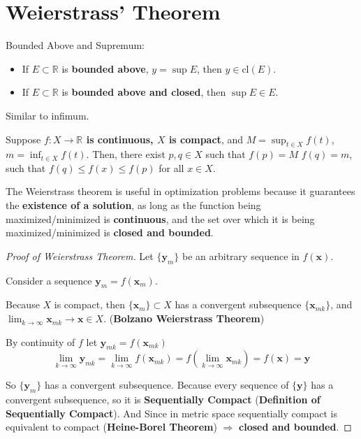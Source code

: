 \section{Weierstrass' Theorem}

\begin{proposition} Bounded Above and Supremum:
    \begin{itemize}
        \item If \(E \subset \mathbb{R}\) is \textbf{bounded above}, \(y = \sup E\), then \(y \in \text{cl} (E)\).
        \item If \(E \subset \mathbb{R}\) is \textbf{bounded above and closed}, then \(\sup E \in E\).
    \end{itemize}
\end{proposition}

\begin{remark*}
    Similar to infimum.
\end{remark*}

\begin{theorem}
    Suppose \textbf{\(f:X\to \mathbb{R}\) is continuous, \(X\) is compact}, and \(M = \sup_{t\in X}f(t)\), \(m = \inf_{t\in X}f(t)\). Then, there exist \(p,q\in X\) such that \(f(p) = M\) \(f(q) = m\), such that \(f(q)\leq f(x)\leq f(p)\) for all \(x\in X\).
\end{theorem}

\begin{remark*}
      The Weierstrass theorem is useful in optimization problems because it guarantees the \textbf{existence of a solution}, as long as the function being maximized/minimized is \textbf{continuous}, and the set over which it is being maximized/minimized is \textbf{closed and bounded}.
\end{remark*}


\begin{proof}[Proof of Weierstrass Theorem]
    Let \(\{\mathbf{y}_m\}\) be an arbitrary sequence in \(f(\mathbf{x})\).

    Consider a sequence \(\mathbf{y}_m=f(\mathbf{x}_m)\).

    Because \( X \) is compact, then \( \{\mathbf{x}_m\} \subset X \) has a convergent subsequence \( \{\mathbf{x}_{mk}\} \), and \( \lim_{k \to \infty} \mathbf{x}_{mk} \to \mathbf{x} \in X \). (\textbf{Bolzano Weierstrass Theorem})

    By continuity of \( f \) let \( \mathbf{y}_{mk} = f(\mathbf{x}_{mk}) \)
    \[
        \lim_{k \to \infty} \mathbf{y}_{mk} = \lim_{k \to \infty} f(\mathbf{x}_{mk}) = f(\lim_{k \to \infty} \mathbf{x}_{mk}) = f(\mathbf{x}) = \mathbf{y}
    \]

    So \(\{\mathbf{y}_m\}\) has a convergent subsequence. Because every sequence of \(\{\mathbf{y}\}\) has a convergent subsequence, so it is \textbf{Sequentially Compact} (\textbf{Definition of Sequentially Compact}). And Since in metric space sequentially compact is equivalent to compact (\textbf{Heine-Borel Theorem}) \( \Longrightarrow \) \textbf{closed and bounded}.
\end{proof}
